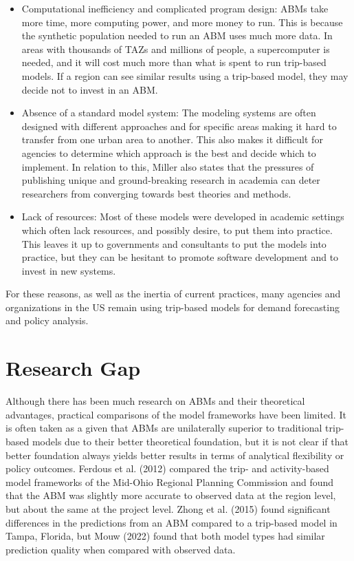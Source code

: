 \documentclass[fancy, oneside, mastersfancy, ms]{byuthesis}
\begin{document}
\begin{itemize}
\item
  Computational inefficiency and complicated program design: ABMs take
  more time, more computing power, and more money to run. This is
  because the synthetic population needed to run an ABM uses much more
  data. In areas with thousands of TAZs and millions of people, a
  supercomputer is needed, and it will cost much more than what is spent
  to run trip-based models. If a region can see similar results using a
  trip-based model, they may decide not to invest in an ABM.
\item
  Absence of a standard model system: The modeling systems are often
  designed with different approaches and for specific areas making it
  hard to transfer from one urban area to another. This also makes it
  difficult for agencies to determine which approach is the best and
  decide which to implement. In relation to this, Miller also states
  that the pressures of publishing unique and ground-breaking research
  in academia can deter researchers from converging towards best
  theories and methods.
\item
  Lack of resources: Most of these models were developed in academic
  settings which often lack resources, and possibly desire, to put them
  into practice. This leaves it up to governments and consultants to put
  the models into practice, but they can be hesitant to promote software
  development and to invest in new systems.
\end{itemize}

For these reasons, as well as the inertia of current practices, many
agencies and organizations in the US remain using trip-based models for
demand forecasting and policy analysis.

\section{Research Gap}\label{sec-literature-research-gap}

Although there has been much research on ABMs and their theoretical
advantages, practical comparisons of the model frameworks have been
limited. It is often taken as a given that ABMs are unilaterally
superior to traditional trip-based models due to their better
theoretical foundation, but it is not clear if that better foundation
always yields better results in terms of analytical flexibility or
policy outcomes. Ferdous et al. (2012) compared the trip- and
activity-based model frameworks of the Mid-Ohio Regional Planning
Commission and found that the ABM was slightly more accurate to observed
data at the region level, but about the same at the project level. Zhong
et al. (2015) found significant differences in the predictions from an
ABM compared to a trip-based model in Tampa, Florida, but Mouw (2022)
found that both model types had similar prediction quality when compared
with observed data.
\end{document}
